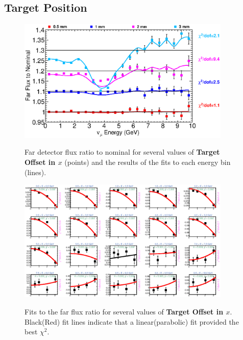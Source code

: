 \subsection{Target Position}

\begin{figure}[ht]
  \begin{center}
    {\includegraphics[width=4.0in]{figures/TargetXOffset_far_summary.eps}}
  \end{center}
\caption{ Far detector flux ratio to nominal for several values of {\bf Target Offset in $x$} (points) and the results of the fits to each energy bin (lines).}
\end{figure}

\begin{figure}[hb]
  \begin{center}
    {\includegraphics[width=4.0in]{figures/TargetXOffset_far_fits.eps}}
  \end{center}
\caption{ Fits to the far flux ratio for several values of {\bf Target Offset in $x$}. Black(Red) fit lines indicate that a linear(parabolic) fit provided the best $\chi^2$. }
\end{figure}

